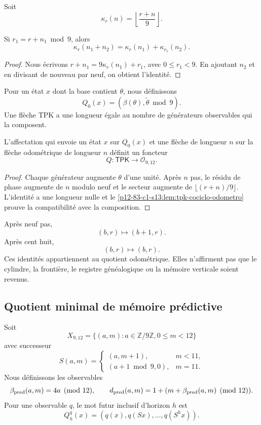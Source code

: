 Soit
\[
 \kappa_r(n)=\left\lfloor\frac{r+n}{9}\right\rfloor.
\]

\begin{lemma}
\label{p12-83-c1-s13:lem:tpk-cociclo-odometro}
Si \(r_1=r+n_1\bmod9\), alors
\[
 \kappa_r(n_1+n_2)
 =\kappa_r(n_1)+\kappa_{r_1}(n_2).
\]
\end{lemma}

\begin{proof}
Nous écrivons \(r+n_1=9\kappa_r(n_1)+r_1\), avec
\(0\leq r_1<9\). En ajoutant \(n_2\) et en divisant de nouveau par neuf,
on obtient l’identité.
\end{proof}

Pour un état \(x\) dont la base contient \(\theta\), nous définissons
\[
 Q_0(x)=(\beta(\theta),\widetilde\theta\bmod9).
\]
Une flèche TPK a une longueur égale au nombre de générateurs observables qui
la composent.

\begin{theorem}
\label{p12-83-c1-s13:thm:tpk-funtor-fase-longitud}
L’affectation qui envoie un état \(x\) sur \(Q_0(x)\) et une flèche de
longueur \(n\) sur la flèche odométrique de longueur \(n\) définit un foncteur
\[
 Q:\mathsf{TPK}\longrightarrow\mathcal O_{9,12}.
\]
\end{theorem}

\begin{proof}
Chaque générateur augmente \(\theta\) d’une unité. Après \(n\) pas, le
résidu de phase augmente de \(n\) modulo neuf et le secteur augmente de
\(\lfloor(r+n)/9\rfloor\). L’identité a une longueur nulle et le
\cref{p12-83-c1-s13:lem:tpk-cociclo-odometro} prouve la compatibilité avec la composition.
\end{proof}

Après neuf pas,
\[
 (b,r)\longmapsto(b+1,r).
\]
Après cent huit,
\[
 (b,r)\longmapsto(b,r).
\]
Ces identités appartiennent au quotient odométrique. Elles n’affirment pas que
le cylindre, la frontière, le registre généalogique ou la mémoire verticale soient revenus.

\subsection{Quotient minimal de mémoire prédictive}

Soit
\[
 X_{9,12}=\{(a,m):a\in\mathbb Z/9\mathbb Z, 0\leq m<12\}
\]
avec successeur
\[
 S(a,m)=
 \begin{cases}
  (a,m+1),&m<11,\\
  (a+1\bmod9,0),&m=11.
 \end{cases}
\]
Nous définissons les observables
\[
 \beta_{\rm pred}(a,m)=4a\pmod{12},
 \qquad
 d_{\rm pred}(a,m)=1+(m+\beta_{\rm pred}(a,m)\pmod{12}).
\]
Pour une observable \(q\), le mot futur inclusif d’horizon \(h\)
est
\[
 Q_h^q(x)=(q(x),q(Sx),\ldots,q(S^hx)).
\]

